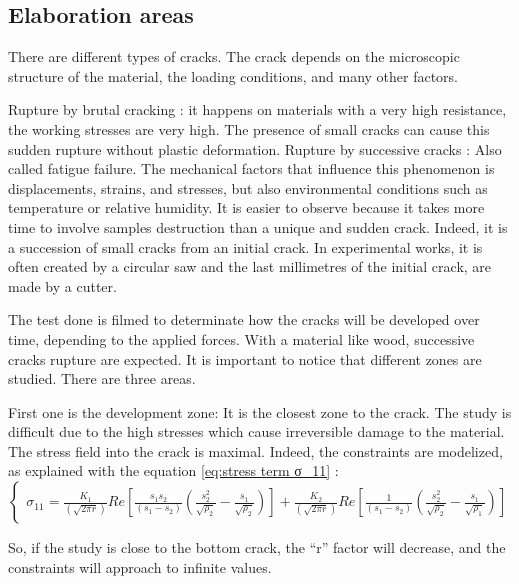 \subsection{Elaboration areas}

There are different types of cracks. The crack depends on the microscopic structure of the material, the loading conditions, and many other factors.

Rupture by brutal cracking : it happens on materials with a very high resistance, the working stresses are very high. The presence of small cracks can cause this sudden rupture without plastic deformation. 
Rupture by successive cracks : Also called fatigue failure. The mechanical factors that influence this phenomenon is displacements, strains, and stresses, but also environmental conditions such as temperature or relative humidity. It is easier to observe because it takes more time to involve samples destruction than a unique and sudden crack. Indeed, it is a succession of small cracks from an initial crack. In experimental works, it is often created by a circular saw and the last millimetres of the initial crack, are made by a cutter.  

The test done is filmed to determinate how the cracks will be developed over time, depending to the applied forces. With a material like wood, successive cracks rupture are expected. It is important to notice that different zones are studied. There are three areas. 

First one is the development zone: It is the closest zone to the crack. The study is difficult due to the high stresses which cause irreversible damage to the material. The stress field into the crack is maximal. Indeed, the constraints are modelized, as explained with the equation \ref{eq:stress term σ_11} :
\begin{equation}
	\left\{
	\begin{array}{rcr}
		\sigma_{11}=\frac{K_{1}}{(\sqrt{2 \pi r})}Re[\frac{s_{1}s_{2}}{(s_{1}-s_{2})}(\frac{s_{2}^{2}}{\sqrt{\rho_{2}}}-\frac{s_{1}}{\sqrt{\rho_{2}}})]+\frac{K_{2}}{(\sqrt{2 \pi r})}Re[\frac{1}{(s_{1}-s_{2})}(\frac{s_{2}^{2}}{\sqrt{\rho_{2}}}-\frac{s_{1}}{\sqrt{\rho_{1}}})]	
	\end{array}
	\right.
	\label{eq:stress term σ_11}
\end{equation} 

So, if the study is close to the bottom crack, the “r” factor will decrease, and the constraints will approach to infinite values.

